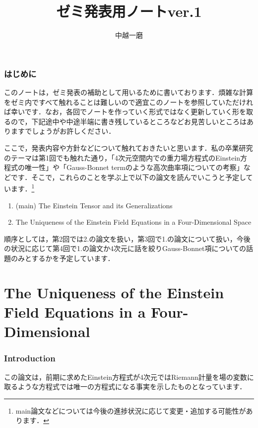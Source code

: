 \documentclass[12pt, a4paper]{jsarticle}
\title{ゼミ発表用ノートver.1}
\author{中越一磨}
\begin{document}
\maketitle

\section*{はじめに}
このノートは，ゼミ発表の補助として用いるために書いております．煩雑な計算をゼミ内ですべて触れることは難しいので適宜このノートを参照していただければ幸いです．なお，各回でノートを作っていく形式ではなく更新していく形を取るので，下記途中や中途半端に書き残しているところなどお見苦しいところはありますでしょうがお許しください．

ここで，発表内容や方針などについて触れておきたいと思います．私の卒業研究のテーマは第1回でも触れた通り，「4次元空間内での重力場方程式のEinstein方程式の唯一性」や「Gauss-Bonnet termのような高次曲率項についての考察」などです．そこで，これらのことを学ぶ上で以下の論文を読んでいこうと予定しています．\footnote{main論文などについては今後の進捗状況に応じて変更・追加する可能性があります．}
\begin{enumerate}
  \item (main) The Einstein Tensor and its Generalizations
  \item The Uniqueness of the Einstein Field Equations in a Four-Dimensional Space
\end{enumerate}

順序としては，第2回では2.の論文を扱い，第3回で1.の論文について扱い，今後の状況に応じて第4回で1.の論文か4次元に話を絞りGauss-Bonnet項についての話題のみとするかを予定しています．
\part{The Uniqueness of the Einstein Field Equations in a Four-Dimensional}
\section{Introduction}
この論文は，前期に求めたEinstein方程式が4次元ではRiemann計量を場の変数に取るような方程式では唯一の方程式になる事実を示したものとなっています．
\end{document}
